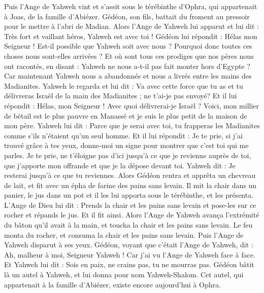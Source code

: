 \begin{multicols}{2}
Puis l'Ange de Yahweh vint et s'assit sous le térébinthe d'Ophra, qui appartenait à Joas, de la famille d'Abiézer. Gédéon, son fils, battait du froment au pressoir pour le mettre à l'abri de Madian.
Alors l'Ange de Yahweh lui apparut et lui dit : Très fort et vaillant héros, Yahweh est avec toi !
Gédéon lui répondit : Hélas mon Seigneur ! Est-il possible que Yahweh soit avec nous ? Pourquoi donc toutes ces choses nous sont-elles arrivées ? Et où sont tous ces prodiges que nos pères nous ont racontés, en disant : Yahweh ne nous a-t-il pas fait monter hors d'Egypte ? Car maintenant Yahweh nous a abandonnés et nous a livrés entre les mains des Madianites.
Yahweh le regarda et lui dit : Va avec cette force que tu as et tu délivreras Israël de la main des Madianites ; ne t'ai-je pas envoyé?
Et il lui répondit : Hélas, mon Seigneur ! Avec quoi délivrerai-je Israël ? Voici, mon millier de bétail est le plus pauvre en Manassé et je suis le plus petit de la maison de mon père.
Yahweh lui dit : Parce que je serai avec toi, tu frapperas les Madianites comme s'ils n'étaient qu'un seul homme.
Et il lui répondit : Je te prie, si j'ai trouvé grâce à tes yeux, donne-moi un signe pour montrer que c'est toi qui me parles.
Je te prie, ne t'éloigne pas d'ici jusqu'à ce que je revienne auprès de toi, que j'apporte mon offrande et que je la dépose devant toi. Yahweh dit : Je resterai jusqu'à ce que tu reviennes.
Alors Gédéon rentra et apprêta un chevreau de lait, et fit avec un épha de farine des pains sans levain. Il mit la chair dans un panier, le jus dans un pot et il les lui apporta sous le térébinthe, et les présenta.
L'Ange de Dieu lui dit : Prends la chair et les pains sans levain et pose-les sur ce rocher et répands le jus. Et il fit ainsi.
Alors l'Ange de Yahweh avança l'extrémité du bâton qu'il avait à la main, et toucha la chair et les pains sans levain. Le feu monta du rocher, et consuma la chair et les pains sans levain. Puis l'Ange de Yahweh disparut à ses yeux.
Gédéon, voyant que c'était l'Ange de Yahweh, dit : Ah, malheur à moi, Seigneur Yahweh ! Car j'ai vu l'Ange de Yahweh face à face.
Et Yahweh lui dit : Sois en paix, ne crains pas, tu ne mourras pas.
Gédéon bâtit là un autel à Yahweh, et lui donna pour nom Yahweh-Shalom. Cet autel, qui appartenait à la famille d'Abiézer, existe encore aujourd'hui à Ophra.

\end{multicols}
